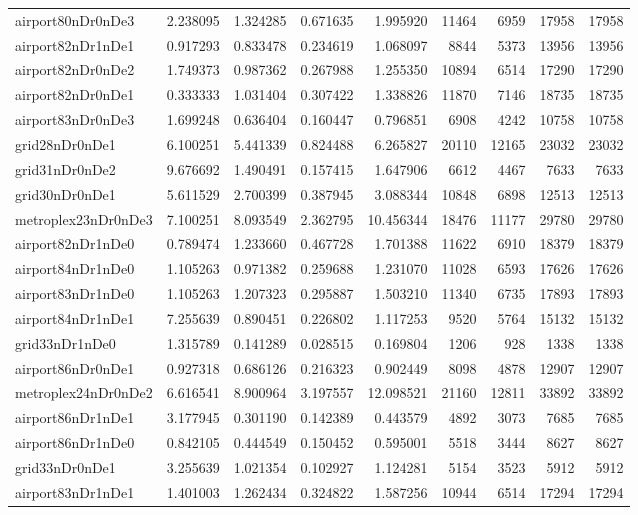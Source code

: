 \begin{longtable}{|l|r|r|r|r|r|r|r|r|}
airport80nDr0nDe3 & 2.238095 & 1.324285 & 0.671635 & 1.995920 & 11464 & 6959 & 17958 & 17958 \\
airport82nDr1nDe1 & 0.917293 & 0.833478 & 0.234619 & 1.068097 & 8844 & 5373 & 13956 & 13956 \\
airport82nDr0nDe2 & 1.749373 & 0.987362 & 0.267988 & 1.255350 & 10894 & 6514 & 17290 & 17290 \\
airport82nDr0nDe1 & 0.333333 & 1.031404 & 0.307422 & 1.338826 & 11870 & 7146 & 18735 & 18735 \\
airport83nDr0nDe3 & 1.699248 & 0.636404 & 0.160447 & 0.796851 & 6908 & 4242 & 10758 & 10758 \\
grid28nDr0nDe1 & 6.100251 & 5.441339 & 0.824488 & 6.265827 & 20110 & 12165 & 23032 & 23032 \\
grid31nDr0nDe2 & 9.676692 & 1.490491 & 0.157415 & 1.647906 & 6612 & 4467 & 7633 & 7633 \\
grid30nDr0nDe1 & 5.611529 & 2.700399 & 0.387945 & 3.088344 & 10848 & 6898 & 12513 & 12513 \\
metroplex23nDr0nDe3 & 7.100251 & 8.093549 & 2.362795 & 10.456344 & 18476 & 11177 & 29780 & 29780 \\
airport82nDr1nDe0 & 0.789474 & 1.233660 & 0.467728 & 1.701388 & 11622 & 6910 & 18379 & 18379 \\
airport84nDr1nDe0 & 1.105263 & 0.971382 & 0.259688 & 1.231070 & 11028 & 6593 & 17626 & 17626 \\
airport83nDr1nDe0 & 1.105263 & 1.207323 & 0.295887 & 1.503210 & 11340 & 6735 & 17893 & 17893 \\
airport84nDr1nDe1 & 7.255639 & 0.890451 & 0.226802 & 1.117253 & 9520 & 5764 & 15132 & 15132 \\
grid33nDr1nDe0 & 1.315789 & 0.141289 & 0.028515 & 0.169804 & 1206 & 928 & 1338 & 1338 \\
airport86nDr0nDe1 & 0.927318 & 0.686126 & 0.216323 & 0.902449 & 8098 & 4878 & 12907 & 12907 \\
metroplex24nDr0nDe2 & 6.616541 & 8.900964 & 3.197557 & 12.098521 & 21160 & 12811 & 33892 & 33892 \\
airport86nDr1nDe1 & 3.177945 & 0.301190 & 0.142389 & 0.443579 & 4892 & 3073 & 7685 & 7685 \\
airport86nDr1nDe0 & 0.842105 & 0.444549 & 0.150452 & 0.595001 & 5518 & 3444 & 8627 & 8627 \\
grid33nDr0nDe1 & 3.255639 & 1.021354 & 0.102927 & 1.124281 & 5154 & 3523 & 5912 & 5912 \\
airport83nDr1nDe1 & 1.401003 & 1.262434 & 0.324822 & 1.587256 & 10944 & 6514 & 17294 & 17294 \\

\end{longtable}
